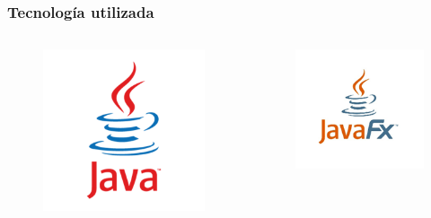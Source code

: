 \documentclass[9pt]{beamer}
\begin{document}
    \begin{frame}
        \frametitle{Tecnología utilizada}                 
        \begin{columns}
            \begin{figure}[H]
                \centering
                \includegraphics[width=\textwidth]{assets/Tecnologia/Java.png}
            \end{figure}

            \begin{figure}[H]
                \centering
                \includegraphics[width=\textwidth]{assets/Tecnologia/JavaFX.png}
            \end{figure}


\end{columns}
\end{frame}
\end{document}
